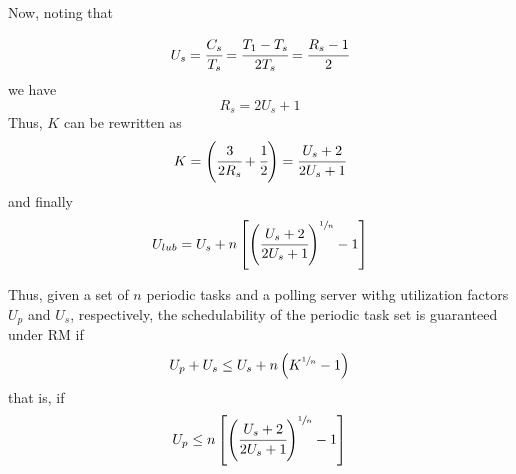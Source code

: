 Now, noting that 
%

\[U_s = \cfrac{C_s}{T_s} = \cfrac{T_1-T_s}{2T_s} = \cfrac{R_s - 1}{2}\]
we have
\[R_s = 2U_s + 1\]
Thus, $K$ can be rewritten as
\[K = \left(\cfrac{3}{2R_s} + \cfrac{1}{2}\right) = \cfrac{U_s + 2}{2U_s + 1}\]
and finally
\[U_{lub} = U_s + n \left[\left( \cfrac{U_s + 2}{2U_s + 1}\right)^{\sfrac{1}{n}}-1\right]\]

Thus, given a set of $n$ periodic tasks and a polling server withg utilization factors $U_p$ and $U_s$, respectively, the schedulability of the periodic task set is guaranteed under RM if
\[U_p + U_s \le U_s + n\left(K^{\sfrac{1}{n}} - 1\right)\]
that is, if
\[U_p \le n \left[\left( \cfrac{U_s + 2}{2U_s + 1}\right)^{\sfrac{1}{n}}-1\right]\]